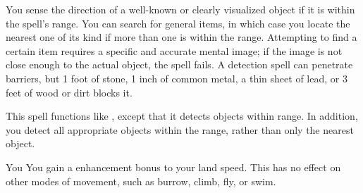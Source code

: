 \begin{spellheader}
    \spellrng{\rnglong}
    \spelldur{\durmed \dismissable}
\end{spellheader}
\begin{spelleffects}
    \spelleffect You sense the direction of a well-known or clearly visualized object if it is within the spell's range. You can search for general items, in which case you locate the nearest one of its kind if more than one is within the range. Attempting to find a certain item requires a specific and accurate mental image; if the image is not close enough to the actual object, the spell fails.
    \spellnotes A detection spell can penetrate barriers, but 1 foot of stone, 1 inch of common metal, a thin sheet of lead, or 3 feet of wood or dirt blocks it.
\end{spelleffects}

\begin{spellheader}
    \spellrng{\rngext}
\end{spellheader}
\begin{spelleffects}
    \spelldur{\durmed \dismissable}
    \spelleffect This spell functions like , except that it detects objects within \rngext range. In addition, you detect all appropriate objects within the range, rather than only the nearest object. 
\end{spelleffects}

\begin{spellheader}
    \spelldur{\durlong \dismissable}
\end{spellheader}
\begin{spelleffects}
    \begin{spelltarget}{You}
        \spelleffect You gain a  enhancement bonus to your land speed. This has no effect on other modes of movement, such as burrow, climb, fly, or swim.
    \end{spelltarget}
\end{spelleffects}

\begin{comment}
\subsubsection{M}
\end{comment}

